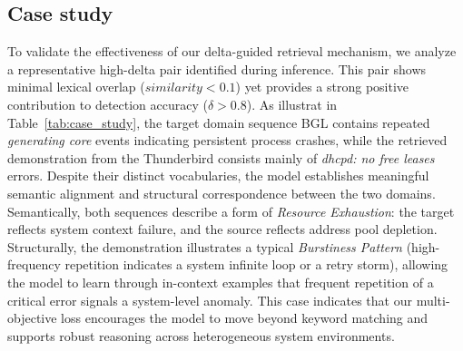 \documentclass[lettersize,journal]{IEEEtran}
\begin{document}

\subsection{Case study}
To validate the effectiveness of our delta-guided retrieval mechanism, we analyze a representative high-delta pair identified during inference. This pair shows minimal lexical overlap ($similarity<0.1$) yet provides a strong positive contribution to detection accuracy ($\delta > 0.8$). As illustrat in Table~\ref{tab:case_study}, the target domain sequence BGL contains repeated \textit{generating core} events indicating persistent process crashes, while the retrieved demonstration from the Thunderbird consists mainly of \textit{dhcpd: no free leases} errors. Despite their distinct vocabularies, the model establishes meaningful semantic alignment and structural correspondence between the two domains. Semantically, both sequences describe a form of \textit{Resource Exhaustion}: the target reflects system context failure, and the source reflects address pool depletion. Structurally, the demonstration illustrates a typical \textit{Burstiness Pattern} (high-frequency repetition indicates a system infinite loop or a retry storm), allowing the model to learn through in-context examples that frequent repetition of a critical error signals a system-level anomaly. This case indicates that our multi-objective loss encourages the model to move beyond keyword matching and supports robust reasoning across heterogeneous system environments.


\end{document}
